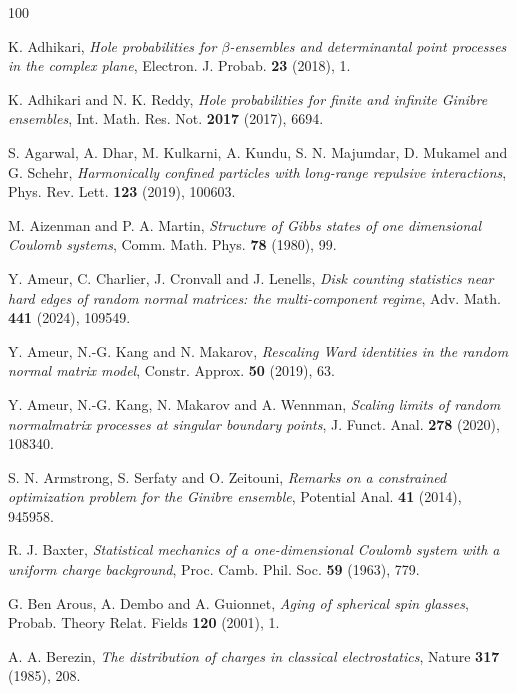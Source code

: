 \documentclass[10pt]{amsart}
\theoremstyle{plain}
\theoremstyle{remark}
\numberwithin{equation}{section}
\begin{document}
 
\begin{thebibliography}{100}

K. Adhikari, \emph{Hole probabilities for $\beta$-ensembles and determinantal point processes in the complex plane}, Electron. J. Probab. \textbf{23} (2018), 1.%


 K. Adhikari and N. K. Reddy, \emph{Hole probabilities for finite and infinite Ginibre ensembles}, Int. Math. Res. Not. \textbf{2017} (2017), 6694.%

 S. Agarwal, A. Dhar, M. Kulkarni, A. Kundu, S. N. Majumdar, D. Mukamel and G. Schehr, \emph{Harmonically confined particles with long-range repulsive interactions}, Phys. Rev. Lett. \textbf{123} (2019), 100603.%


 M. Aizenman and P. A. Martin, {\it Structure of Gibbs states of one dimensional Coulomb systems}, Comm. Math. Phys. \textbf{78} (1980), 99.%


 Y. Ameur, C. Charlier, J. Cronvall and J. Lenells, \emph{Disk counting statistics near hard edges of random normal matrices: the multi-component regime}, Adv. Math. \textbf{441} (2024), 109549.

 Y. Ameur, N.-G. Kang and N. Makarov, \emph{Rescaling Ward identities in the random normal matrix model}, Constr. Approx. \textbf{50} (2019), 63.%

 Y. Ameur, N.-G. Kang, N. Makarov and A. Wennman, \emph{Scaling limits of random normalmatrix processes at singular boundary points}, J. Funct. Anal. \textbf{278} (2020), 108340. 

 S. N. Armstrong, S. Serfaty and O. Zeitouni, \emph{Remarks on a constrained optimization problem for the Ginibre ensemble}, Potential Anal. \textbf{41} (2014), 945958.


	R. J. Baxter, \emph{Statistical mechanics of a one-dimensional Coulomb system with a uniform charge background}, {Proc. Camb. Phil. Soc. \textbf{59} (1963), 779}.




 G. Ben Arous, A. Dembo and A. Guionnet, \emph{Aging of spherical spin glasses}, Probab. Theory Relat. Fields \textbf{120} (2001), 1.%


 A. A. Berezin, \emph{The distribution of charges in classical electrostatics}, Nature \textbf{317} (1985), 208. 


\end{thebibliography}
\end{document}
